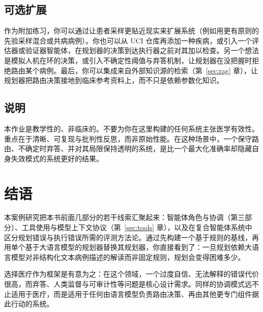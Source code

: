 \subsection*{可选扩展}

作为附加练习，你可以通过让患者采样更贴近现实来扩展系统（例如用更有原则的先验采样混合或共病病例）。你也可以从 UCI 仓库再添加一种疾病，或引入一个评估器或验证器智能体，在规划器的决策到达执行器之前对其加以检查。另一个想法是模拟人机在环的决策，或引入不确定性阈值与弃答机制，让规划器在没把握时拒绝路由某个病例。最后，你可以集成来自外部知识源的检索（第~\ref{sec:rag} 章），让规划器把路由决策接地到临床参考资料上，而不只是依赖参数化知识。


\subsection*{说明}

本作业是教学性的、非临床的。不要为你在这里构建的任何系统主张医学有效性。重点在于清晰、可复现与批判性反思，而非原始性能。在这种场景中，一个保守路由、不确定时弃答、并对其局限保持透明的系统，是比一个最大化准确率却隐藏自身失效模式的系统更好的结果。


\section{结语}

本案例研究把本书前面几部分的若干线索汇聚起来：智能体角色与协调（第三部分）、工具使用与模型上下文协议（第~\ref{sec:tools} 章），以及在复合智能体系统中区分规划错误与执行错误所需的评测方法论。通过先构建一个基于规则的基线，再用单个基于大语言模型的规划器替换其规划器，你直接看到了：一旦规划依赖大语言模型对非结构化文本病例描述的解读而非固定规则，规划会变得困难多少。

选择医疗作为框架是有意为之：在这个领域，一个过度自信、无法解释的错误代价很高，而弃答、人类监督与可审计性等问题是核心设计需求。同样的协调模式远不止适用于医疗，而是适用于任何由语言模型负责路由决策、再由其他更专门组件据此行动的系统。






